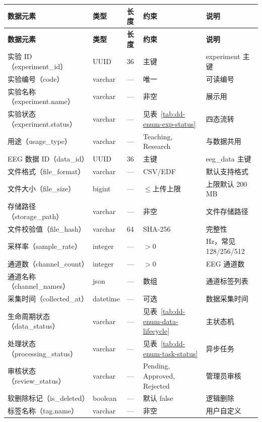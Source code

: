 {\small
\begin{longtable}{|p{32mm}|p{20mm}|p{16mm}|p{24mm}|p{42mm}|}
\hline
\textbf{数据元素} & \textbf{类型} & \textbf{长度} & \textbf{约束} & \textbf{说明}\\\hline
\endfirsthead
\hline
\textbf{数据元素} & \textbf{类型} & \textbf{长度} & \textbf{约束} & \textbf{说明}\\\hline
\endhead
实验 ID（experiment\_id）& UUID & 36 & 主键 & experiment 主键 \\ \hline
实验编号（code）& varchar & --- & 唯一 & 可读编号 \\ \hline
实验名称（experiment.name）& varchar & --- & 非空 & 展示用 \\ \hline
实验状态（experiment.status）& varchar & --- & 见表~\ref{tab:dd-enum-exp-status} & 四态流转 \\ \hline
用途（usage\_type）& varchar & --- & Teaching, Research & 与数据共用 \\ \hline
EEG 数据 ID（data\_id）& UUID & 36 & 主键 & eeg\_data 主键 \\ \hline
文件格式（file\_format）& varchar & --- & CSV/EDF & 默认支持格式 \\ \hline
文件大小（file\_size）& bigint & --- & $\le$上传上限 & 上限默认 200 MB \\ \hline
存储路径（storage\_path）& varchar & --- & 非空 & 文件存储路径 \\ \hline
文件校验值（file\_hash）& varchar & 64 & SHA-256 & 完整性 \\ \hline
采样率（sample\_rate）& integer & --- & $>$0 & Hz，常见 128/256/512 \\ \hline
通道数（channel\_count）& integer & --- & $>$0 & EEG 通道数 \\ \hline
通道名称（channel\_names）& json & --- & 数组 & 通道标签列表 \\ \hline
采集时间（collected\_at）& datetime & --- & 可选 & 数据采集时间 \\ \hline
生命周期状态（data\_status）& varchar & --- & 见表~\ref{tab:dd-enum-data-lifecycle} & 主状态机 \\ \hline
处理状态（processing\_status）& varchar & --- & 见表~\ref{tab:dd-enum-task-status} & 异步任务 \\ \hline
审核状态（review\_status）& varchar & --- & Pending, Approved, Rejected & 管理员审核 \\ \hline
软删除标记（is\_deleted）& boolean & --- & 默认 false & 逻辑删除 \\ \hline
标签名称（tag.name）& varchar & --- & 非空 & 用户自定义 \\ \hline
\end{longtable}
}

